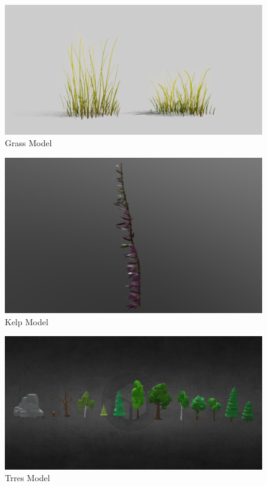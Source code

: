 \documentclass{article}
\begin{document}
    \begin{figure}
        \centering
        \includegraphics[width=\textwidth]{images/models/grass.png}
        \caption{Grass Model \cite{model-grass}} \label{fig:grass-model}
    \end{figure}
    \begin{figure}
        \centering
        \includegraphics[width=\textwidth]{images/models/kelp.png}
        \caption{Kelp Model \cite{model-kelp}} \label{fig:kelp-model}
    \end{figure}
    \begin{figure}
        \centering
        \includegraphics[width=\textwidth]{images/models/trees.png}
        \caption{Trres Model \cite{model-trees}} \label{fig:trees-model}
    \end{figure}
\end{document}
